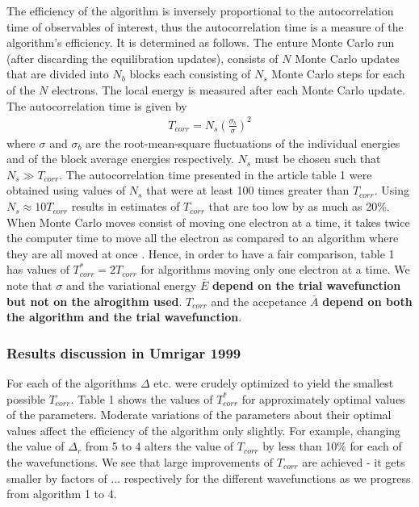 \documentclass[twoside,english]{uiofysmaster}
\begin{document}
The efficiency of the algorithm is inversely proportional to the autocorrelation time of observables of interest, thus the autocorrelation time is a measure of the algorithm's efficiency. It is determined as follows. The enture Monte Carlo run (after discarding the equilibration updates), consists of $N$ Monte Carlo updates that are divided into $N_b$ blocks each consisting of $N_s$ Monte Carlo steps for each of the $N$ electrons. The local energy is measured after each Monte Carlo update. The autocorrelation time is given by 
\begin{align}
	T_{corr} = N_s (\frac{\sigma_b}{\sigma})^2
\end{align}
where $\sigma$ and $\sigma_b$ are the root-mean-square fluctuations of the individual energies and of the block average energies respectively. $N_s$ must be chosen such that $N_s \gg T_{corr}$. The autocorrelation time presented in the article table 1 were obtained using values of $N_s$ that were at least 100 times greater than $T_{corr}$. Using $N_s \approx 10 T_{corr}$ results in estimates of $T_{corr}$ that are too low by as much as 20\%. When Monte Carlo moves consist of moving one electron at a time, it takes twice the computer time to move all the electron as compared to an algorithm where they are all moved at once \cite{Ceperley1977}. Hence, in order to have a fair comparison, table 1 has values of $T_{corr}^\ast = 2T_{corr}$ for algorithms moving only one electron at a time. We note that $\sigma$ and the variational energy $\bar{E}$ \textbf{depend on the trial wavefunction but not on the alrogithm used}. $T_{corr}$ and the accpetance $\bar{A}$ \textbf{depend on both the algorithm and the trial wavefunction}.
\cite{Umrigar1999}

\subsubsection{Results discussion in Umrigar 1999}
For each of the algorithms $\Delta$ etc. were crudely optimized to yield the smallest possible $T_{corr}$. Table 1 shows the values of $T_{corr}^\ast$ for approximately optimal values of the parameters. Moderate variations of the parameters about their optimal values affect the efficiency of the algorithm only slightly. For example, changing the value of $\Delta_r$ from 5 to 4 alters the value of $T_{corr}$ by less than 10\% for each of the wavefunctions. We see that large improvements of $T_{corr}$ are achieved - it gets smaller by factors of ... respectively for the different wavefunctions as we progress from algorithm 1 to 4.
\end{document}
